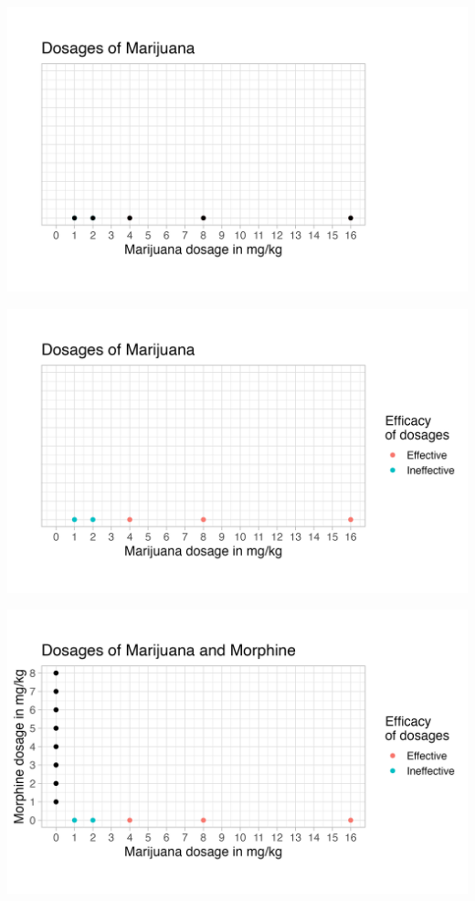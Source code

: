 \documentclass[14pt]{beamer}
\begin{document}
\begin{frame}
\begin{center}
\includegraphics[scale=0.6]{iso1.png}
\end{center}
\end{frame}

\begin{frame}
\begin{center}
\includegraphics[scale=0.6]{iso2.png}
\end{center}
\end{frame}

\begin{frame}
\begin{center}
\includegraphics[scale=0.6]{iso3.png}
\end{center}
\end{frame}
\end{document}
